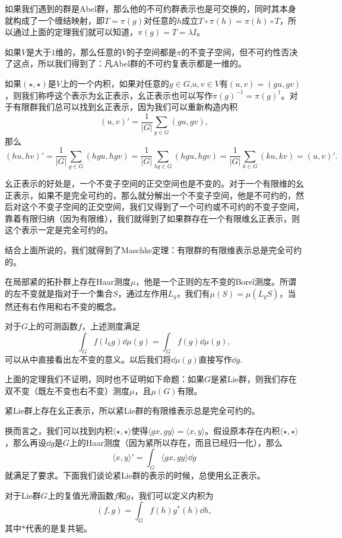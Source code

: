 \documentclass[9pt]{extarticle}
\begin{document}
\para 如果我们遇到的群是Abel群，那么他的不可约群表示也是可交换的，同时其本身就构成了一个缠结映射，即$T=\pi(g)$对任意的$h$成立$T\circ \pi(h)=\pi(h)\circ T$，所以通过上面的定理我们就可以知道，$\pi(g)=T=\lambda I$。

如果$V$是大于$1$维的，那么任意的$V$的子空间都是$\pi$的不变子空间，但不可约性否决了这点，所以我们得到了：凡Abel群的不可约复表示都是一维的。

\para 如果$(\star,\star)$是$V$上的一个内积，如果对任意的$g\in G$,$u,v\in V$有$(u,v)=(gu,gv)$，则我们称呼这个表示为幺正表示，幺正表示也可以写作$\pi(g)^{-1}=\pi(g)^\dag$。对于有限群我们总可以找到幺正表示，因为我们可以重新构造内积
\[
	(u,v)'=\frac{1}{|G|}\sum_{g\in G}(gu,gv),
\]
那么
\[
	(hu,hv)'=\frac{1}{|G|}\sum_{g\in G}(hgu,hgv)=\frac{1}{|G|}\sum_{hg\in G}(hgu,hgv)=\frac{1}{|G|}\sum_{k\in G}(ku,kv)=(u,v)'.
\]

幺正表示的好处是，一个不变子空间的正交空间也是不变的。对于一个有限维的幺正表示，如果不是完全可约的，那么就分解出一个不变子空间，他是不可约的，然后对这个不变子空间的正交空间，我们又得到了一个可约或不可约的不变子空间，靠着有限归纳（因为有限维），我们就得到了如果群存在一个有限维幺正表示，则这个表示一定是完全可约的。

\theo 结合上面所说的，我们就得到了Maschke定理：有限群的有限维表示总是完全可约的。 

\theo 在局部紧的拓扑群上存在Haar测度$\mu$，他是一个正则的左不变的Borel测度。所谓的左不变就是指对于一个集合$S$，通过左作用$L_g$，我们有$\mu(S)=\mu(L_gS)$，当然还有右作用和右不变的概念。

对于$G$上的可测函数$f$，上述测度满足
\[
	\int_G f(l_h g)\dd \mu(g)=\int_G f(g)\dd \mu(g),
\]
可以从中直接看出左不变的意义。以后我们将$\dd \mu(g)$直接写作$\dd g$.

\para 上面的定理我们不证明，同时也不证明如下命题：如果$G$是紧Lie群，则我们存在双不变（既左不变也右不变）测度$\mu$，且$\mu(G)$有限。

\pro 紧Lie群上存在幺正表示，所以紧Lie群的有限维表示总是完全可约的。 

换而言之，我们可以找到内积$\langle \star,\star\rangle$使得$\langle gx,gy\rangle=\langle x,y\rangle$。假设原本存在内积$\langle \star,\star \rangle$，那么再设$\dd g$是$G$上的Haar测度（因为紧所以存在，而且已经归一化），那么
\[
	\langle x,y\rangle'=\int_G \langle gx,gy \rangle \dd g
\]
就满足了要求。下面我们谈论紧Lie群的表示的时候，总使用幺正表示。

\para 对于Lie群$G$上的复值光滑函数$f$和$g$，我们可以定义内积为
\[
	(f,g)=\int_G f(h)g^*(h)\dd h,
\]
其中$*$代表的是复共轭。
\end{document}
